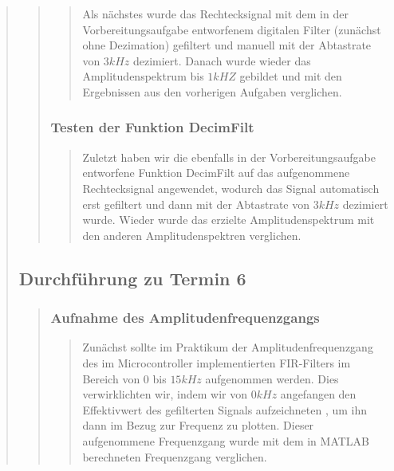 \begin{quote}
\begin{quote}
\begin{quote}
			Als nächstes wurde das Rechtecksignal mit dem in der Vorbereitungsaufgabe
			entworfenem digitalen Filter (zunächst ohne Dezimation) gefiltert und manuell
			mit der Abtastrate von $3 kHz$ dezimiert. Danach wurde wieder das
			Amplitudenspektrum bis $1 kHZ$ gebildet und mit den Ergebnissen aus den
			vorherigen Aufgaben verglichen.
			
			\end{quote}%
			
			\subsubsection{Testen der Funktion DecimFilt}
			\begin{quote}
			
			Zuletzt haben wir die ebenfalls in der Vorbereitungsaufgabe entworfene
			Funktion DecimFilt auf das aufgenommene Rechtecksignal angewendet, wodurch das
			Signal automatisch erst gefiltert und dann mit der Abtastrate von $3 kHz$
			dezimiert wurde. Wieder wurde das erzielte Amplitudenspektrum mit den anderen
			Amplitudenspektren verglichen.
			
			\end{quote}%

		\end{quote}%
		
		\subsection{Durchführung zu Termin 6}
		\begin{quote}
		
			\subsubsection{Aufnahme des Amplitudenfrequenzgangs}
			\begin{quote}
			
			Zunächst sollte im Praktikum der Amplitudenfrequenzgang des im
			Microcontroller implementierten FIR-Filters im Bereich von $0$ bis $15 kHz$
			aufgenommen werden. Dies verwirklichten wir, indem wir von $0 kHz$ angefangen
			den Effektivwert des gefilterten Signals aufzeichneten , um ihn dann im Bezug
			zur Frequenz zu plotten.
			Dieser aufgenommene Frequenzgang wurde mit dem in MATLAB berechneten
			Frequenzgang verglichen. 
			

\end{quote}
\end{quote}
\end{quote}
